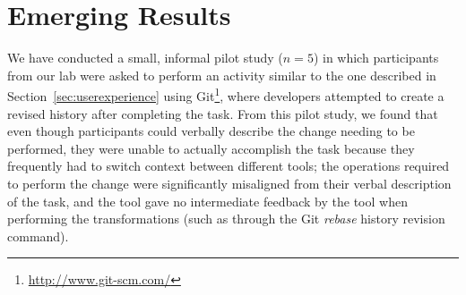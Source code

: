 \documentclass[conference]{IEEEtran}
\begin{document}

\section{Emerging Results}

We have conducted a small, informal pilot study ($n = 5$) in which participants from our lab were asked to perform an activity similar to the one described in Section~\ref{sec:userexperience} using Git\footnote{\url{http://www.git-scm.com/}}, where developers attempted to create a revised history after completing the task. 
From this pilot study, we found that even though participants could verbally describe the change needing to be performed, they were unable to actually accomplish the task because they frequently had to switch context between different tools; 
the operations required to perform the change were significantly misaligned from their verbal description of the task, and the tool gave no intermediate feedback by the tool when performing the transformations (such as through the Git \emph{rebase} history revision command). 
\end{document}
